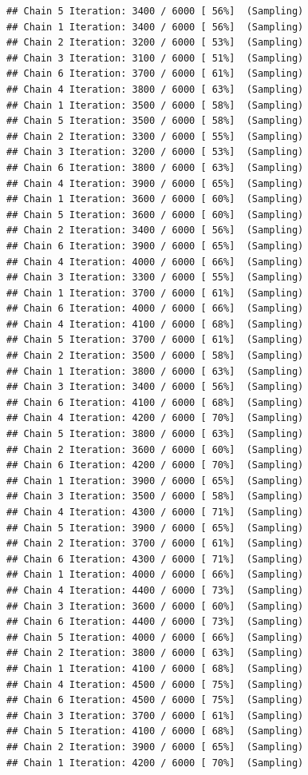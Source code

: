 \documentclass[
]{article}
\begin{document}
\begin{verbatim}
## Chain 5 Iteration: 3400 / 6000 [ 56%]  (Sampling) 
## Chain 1 Iteration: 3400 / 6000 [ 56%]  (Sampling) 
## Chain 2 Iteration: 3200 / 6000 [ 53%]  (Sampling) 
## Chain 3 Iteration: 3100 / 6000 [ 51%]  (Sampling) 
## Chain 6 Iteration: 3700 / 6000 [ 61%]  (Sampling) 
## Chain 4 Iteration: 3800 / 6000 [ 63%]  (Sampling) 
## Chain 1 Iteration: 3500 / 6000 [ 58%]  (Sampling) 
## Chain 5 Iteration: 3500 / 6000 [ 58%]  (Sampling) 
## Chain 2 Iteration: 3300 / 6000 [ 55%]  (Sampling) 
## Chain 3 Iteration: 3200 / 6000 [ 53%]  (Sampling) 
## Chain 6 Iteration: 3800 / 6000 [ 63%]  (Sampling) 
## Chain 4 Iteration: 3900 / 6000 [ 65%]  (Sampling) 
## Chain 1 Iteration: 3600 / 6000 [ 60%]  (Sampling) 
## Chain 5 Iteration: 3600 / 6000 [ 60%]  (Sampling) 
## Chain 2 Iteration: 3400 / 6000 [ 56%]  (Sampling) 
## Chain 6 Iteration: 3900 / 6000 [ 65%]  (Sampling) 
## Chain 4 Iteration: 4000 / 6000 [ 66%]  (Sampling) 
## Chain 3 Iteration: 3300 / 6000 [ 55%]  (Sampling) 
## Chain 1 Iteration: 3700 / 6000 [ 61%]  (Sampling) 
## Chain 6 Iteration: 4000 / 6000 [ 66%]  (Sampling) 
## Chain 4 Iteration: 4100 / 6000 [ 68%]  (Sampling) 
## Chain 5 Iteration: 3700 / 6000 [ 61%]  (Sampling) 
## Chain 2 Iteration: 3500 / 6000 [ 58%]  (Sampling) 
## Chain 1 Iteration: 3800 / 6000 [ 63%]  (Sampling) 
## Chain 3 Iteration: 3400 / 6000 [ 56%]  (Sampling) 
## Chain 6 Iteration: 4100 / 6000 [ 68%]  (Sampling) 
## Chain 4 Iteration: 4200 / 6000 [ 70%]  (Sampling) 
## Chain 5 Iteration: 3800 / 6000 [ 63%]  (Sampling) 
## Chain 2 Iteration: 3600 / 6000 [ 60%]  (Sampling) 
## Chain 6 Iteration: 4200 / 6000 [ 70%]  (Sampling) 
## Chain 1 Iteration: 3900 / 6000 [ 65%]  (Sampling) 
## Chain 3 Iteration: 3500 / 6000 [ 58%]  (Sampling) 
## Chain 4 Iteration: 4300 / 6000 [ 71%]  (Sampling) 
## Chain 5 Iteration: 3900 / 6000 [ 65%]  (Sampling) 
## Chain 2 Iteration: 3700 / 6000 [ 61%]  (Sampling) 
## Chain 6 Iteration: 4300 / 6000 [ 71%]  (Sampling) 
## Chain 1 Iteration: 4000 / 6000 [ 66%]  (Sampling) 
## Chain 4 Iteration: 4400 / 6000 [ 73%]  (Sampling) 
## Chain 3 Iteration: 3600 / 6000 [ 60%]  (Sampling) 
## Chain 6 Iteration: 4400 / 6000 [ 73%]  (Sampling) 
## Chain 5 Iteration: 4000 / 6000 [ 66%]  (Sampling) 
## Chain 2 Iteration: 3800 / 6000 [ 63%]  (Sampling) 
## Chain 1 Iteration: 4100 / 6000 [ 68%]  (Sampling) 
## Chain 4 Iteration: 4500 / 6000 [ 75%]  (Sampling) 
## Chain 6 Iteration: 4500 / 6000 [ 75%]  (Sampling) 
## Chain 3 Iteration: 3700 / 6000 [ 61%]  (Sampling) 
## Chain 5 Iteration: 4100 / 6000 [ 68%]  (Sampling) 
## Chain 2 Iteration: 3900 / 6000 [ 65%]  (Sampling) 
## Chain 1 Iteration: 4200 / 6000 [ 70%]  (Sampling) 

\end{verbatim}
\end{document}
